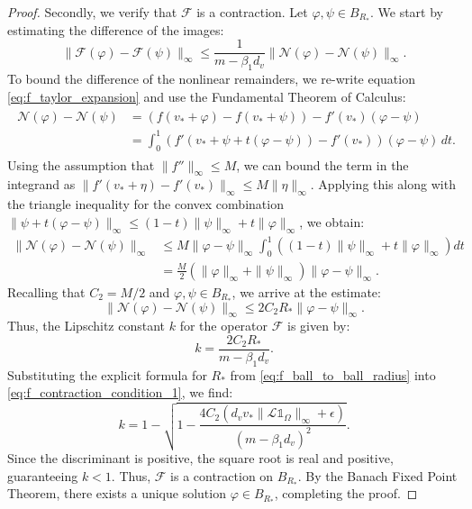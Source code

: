 \documentclass[preprint,12pt]{elsarticle}
\theoremstyle{plain}
\theoremstyle{definition}
\theoremstyle{remark}
\begin{document}
\begin{proof}
    Secondly, we verify that $\mathcal{F}$ is a contraction. Let $\varphi, \psi \in B_{R_*}$. We start by estimating the difference of the images:
    \begin{equation}
        \| \mathcal{F}(\varphi) - \mathcal{F}(\psi) \|_\infty 
        \leq \frac{1}{m - \beta_1 d_v} \| \mathcal{N}(\varphi) - \mathcal{N}(\psi) \|_\infty.
    \end{equation}
    To bound the difference of the nonlinear remainders, we re-write equation \eqref{eq:f_taylor_expansion} and use the Fundamental Theorem of Calculus:
    \begin{align}
        \begin{split}
            \mathcal{N}(\varphi) - \mathcal{N}(\psi) 
            &= \left( f(v_* + \varphi) - f(v_* + \psi) \right)  - f'(v_*) (\varphi - \psi)\\
            &=
            \int_0^1 \left( f'(v_* + \psi + t(\varphi - \psi)) - f'(v_*) \right) (\varphi - \psi) \, dt.
        \end{split}
    \end{align}
    Using the assumption that $\|f''\|_\infty \leq M$, we can bound the term in the integrand as $\|f'(v_* + \eta) - f'(v_*)\|_\infty \leq M \|\eta\|_\infty$. Applying this along with the triangle inequality for the convex combination $\|\psi + t(\varphi - \psi)\|_\infty \leq (1-t)\|\psi\|_\infty + t\|\varphi\|_\infty$, we obtain:
    \begin{align}
        \| \mathcal{N}(\varphi) - \mathcal{N}(\psi) \|_\infty 
        &\leq M \|\varphi - \psi\|_\infty \int_0^1 \left( (1-t)\|\psi\|_\infty + t\|\varphi\|_\infty \right) dt \\
        &= \frac{M}{2} (\|\varphi\|_\infty + \|\psi\|_\infty) \|\varphi - \psi\|_\infty.
    \end{align}
    Recalling that $C_2 = M/2$ and $\varphi, \psi \in B_{R_*}$, we arrive at the estimate:
    \begin{equation}
        \| \mathcal{N}(\varphi) - \mathcal{N}(\psi) \|_\infty \leq 2 C_2 R_* \|\varphi - \psi\|_\infty.
    \end{equation}
    Thus, the Lipschitz constant $k$ for the operator $\mathcal{F}$ is given by:
    \begin{equation}
        \label{eq:f_contraction_condition_1}
        k = \frac{2 C_2 R_*}{m - \beta_1 d_v}.
    \end{equation}
    Substituting the explicit formula for $R_*$ from \eqref{eq:f_ball_to_ball_radius} into \eqref{eq:f_contraction_condition_1}, we find:
    \begin{equation}
        \label{eq:f_contraction_condition_2}
        k = 1 - 
        \sqrt{ 
        1 
        -
        \frac{4 C_2 (d_v v_* \|\mathcal{L}\mathds{1}_\Omega\|_\infty + \epsilon)}{(m - \beta_1 d_v)^2}
        }.
    \end{equation}
    Since the discriminant is positive, the square root is real and positive, guaranteeing $k < 1$. Thus, $\mathcal{F}$ is a contraction on $B_{R_*}$. By the Banach Fixed Point Theorem, there exists a unique solution $\varphi \in B_{R_*}$, completing the proof.
\end{proof}
\end{document}
